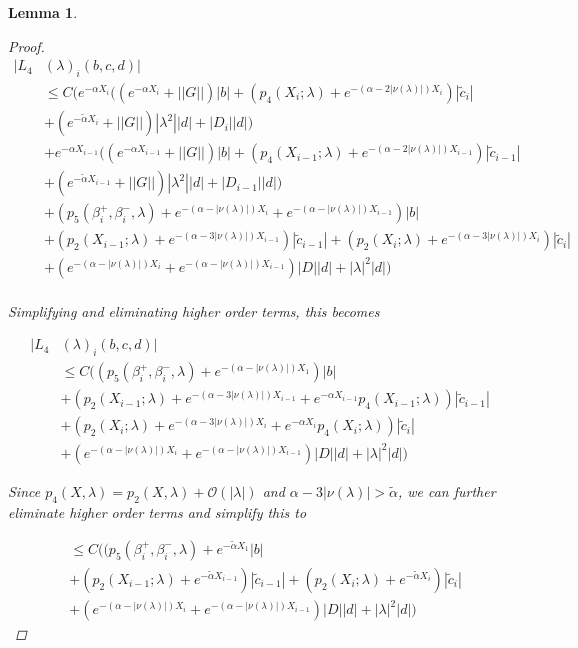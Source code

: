 \documentclass[12pt]{article}
\newtheorem{lemma}{Lemma}
\begin{document}
\begin{lemma}
\begin{proof}
\begin{align*}
|L_4&(\lambda)_i(b, c, d)|\\
&\leq C \Big( e^{-\alpha X_i} ( (e^{-\alpha X_i} + ||G||) |b| + ( p_4(X_i; \lambda) + e^{-(\alpha - 2|\nu(\lambda)|)X_i} )|\tilde{c}_i| \\
&+ (e^{-\tilde{\alpha} X_i} + ||G||) |\lambda^2| |d| + |D_i||d| ) \\
&+ e^{-\alpha X_{i-1}} ( (e^{-\alpha X_{i-1}} + ||G||) |b| + ( p_4(X_{i-1}; \lambda) + e^{-(\alpha - 2 |\nu(\lambda)|)X_{i-1}} )|\tilde{c}_{i-1}| \\
&+ (e^{-\tilde{\alpha} X_{i-1}} + ||G||) |\lambda^2| |d| + |D_{i-1}||d| ) \\
&+ (p_5(\beta_i^+, \beta_i^-, \lambda) + e^{-(\alpha - |\nu(\lambda)|) X_i} + e^{-(\alpha - |\nu(\lambda)|) X_{i-1}}) |b| \\
&+ (p_2(X_{i-1}; \lambda) + e^{-(\alpha - 3 |\nu(\lambda)|) X_{i-1}}) |\tilde{c}_{i-1}| + (p_2(X_i; \lambda) + e^{-(\alpha - 3 |\nu(\lambda)|) X_i})|\tilde{c}_i| \\
&+ (e^{-(\alpha - |\nu(\lambda)|) X_i} + e^{-(\alpha - |\nu(\lambda)|) X_{i-1}})|D||d| + |\lambda|^2|d|
\Big) \\
\end{align*}

Simplifying and eliminating higher order terms, this becomes

\begin{align*}
|L_4&(\lambda)_i(b, c, d)|\\
&\leq C \Big(
(p_5(\beta_i^+, \beta_i^-, \lambda) + e^{-(\alpha - |\nu(\lambda)|) X_1}) |b| \\
&+ (p_2(X_{i-1}; \lambda) + e^{-(\alpha - 3 |\nu(\lambda)|) X_{i-1}} + e^{-\alpha X_{i-1}} p_4(X_{i-1}; \lambda) ) |\tilde{c}_{i-1}| \\
&+ (p_2(X_i; \lambda) + e^{-(\alpha - 3 |\nu(\lambda)|) X_i} + e^{-\alpha X_i} p_4(X_i; \lambda) )|\tilde{c}_i| \\
&+ (e^{-(\alpha - |\nu(\lambda)|) X_i} + e^{-(\alpha - |\nu(\lambda)|) X_{i-1}})|D||d|+ |\lambda|^2|d|
\Big)
\end{align*}

Since $p_4(X, \lambda) = p_2(X, \lambda) + \mathcal{O}(|\lambda|)$ and $\alpha - 3 |\nu(\lambda)| > \tilde{\alpha}$, we can further eliminate higher order terms and simplify this to

\begin{align*}
&\leq C \Big(
(p_5(\beta_i^+, \beta_i^-, \lambda) + e^{-\tilde{\alpha} X_1}  |b| \\
&+ (p_2(X_{i-1}; \lambda) + e^{-\tilde{\alpha} X_{i-1}})|\tilde{c}_{i-1}| 
+ (p_2(X_i; \lambda) + e^{-\tilde{\alpha} X_i} )|\tilde{c}_i| \\
&+ (e^{-(\alpha - |\nu(\lambda)|) X_i} + e^{-(\alpha - |\nu(\lambda)|) X_{i-1}})|D||d| + |\lambda|^2|d|
\Big)
\end{align*}


\end{proof}
\end{lemma}
\end{document}
